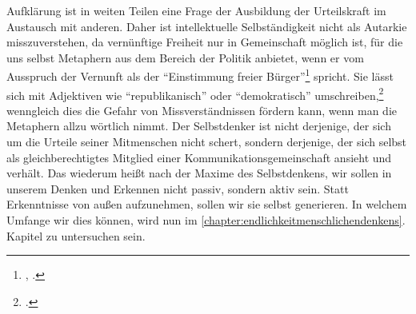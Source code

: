 Aufklärung ist in weiten Teilen eine Frage der Ausbildung der Urteilskraft
im Austausch mit anderen.
Daher ist intellektuelle Selbständigkeit nicht als Autarkie misszuverstehen, da
vernünftige Freiheit nur in Gemeinschaft möglich ist, für die uns
 selbst Metaphern aus dem Bereich der Politik anbietet,
wenn er vom Ausspruch der Vernunft als der \enquote{Einstimmung freier
Bürger}\footnote{\cite[][B 766]{Kant:KritikderreinenVernunft2003}, \cite[][III:
484.12]{Kant:GesammelteWerke1900ff.}.} spricht. Sie lässt sich mit Adjektiven
wie \enquote{republikanisch} oder \enquote{demokratisch}
umschreiben,\footnote{\cite[Vgl.][]{Hoeffe:EinerepublikanischeVernunft1996}.}
wenngleich dies die Gefahr von Missverständnissen fördern kann, wenn man die
Metaphern allzu wörtlich nimmt. Der Selbstdenker ist nicht derjenige, der sich
um die Urteile seiner Mitmenschen nicht schert, sondern derjenige, der sich
selbst als gleichberechtigtes Mitglied einer Kommunikationsgemeinschaft ansieht
und verhält. Das wiederum heißt nach der Maxime des Selbstdenkens, wir sollen in
unserem Denken und Erkennen nicht passiv, sondern aktiv sein. Statt Erkenntnisse
von außen aufzunehmen, sollen wir sie selbst generieren. In welchem Umfange wir
dies können, wird nun im \ref{chapter:endlichkeitmenschlichendenkens}. Kapitel
zu untersuchen sein.



